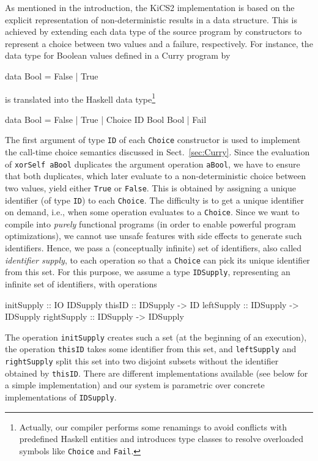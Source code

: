 \documentclass{llncs}
\newcommand{\code}[1]{\mbox{\small\texttt{#1}}}
\begin{document}
As mentioned in the introduction, the KiCS2 implementation
is based on the explicit representation of non-deterministic results
in a data structure.
This is achieved by extending each data type of the source program
by constructors to represent a choice between two values
and a failure, respectively.
For instance, the data type for Boolean values defined in a Curry program by
\begin{curry}
  data Bool = False | True
\end{curry}
is translated into the Haskell data type\footnote{Actually,
our compiler performs some renamings to avoid conflicts with
predefined Haskell entities and introduces type classes
to resolve overloaded symbols like \code{Choice} and \code{Fail}.}
\begin{haskell}
  data Bool = False | True | Choice ID Bool Bool | Fail
\end{haskell}
The first argument of type \code{ID} of each \code{Choice} constructor
is used to implement the call-time choice semantics
discussed in Sect.~\ref{sec:Curry}.
Since the evaluation of \code{xorSelf aBool} duplicates
the argument operation \code{aBool}, we have to ensure
that both duplicates, which later evaluate to a non-deterministic
choice between two values, yield either \code{True} or \code{False}.
This is obtained by assigning a unique identifier (of type \code{ID})
to each \code{Choice}. The difficulty is to get a unique identifier
on demand, i.e., when some operation evaluates to a \code{Choice}.
Since we want to compile into \emph{purely} functional programs
(in order to enable powerful program optimizations),
we cannot use unsafe features with side effects to generate
such identifiers.
Hence, we pass a (conceptually infinite) set of identifiers,
also called \emph{identifier supply},
to each operation so that a \code{Choice} can pick its unique identifier from
this set.
For this purpose, we assume a type \code{IDSupply},
representing an infinite set of identifiers,
with operations
\begin{haskell}
  initSupply  :: IO IDSupply
  thisID      :: IDSupply -> ID
  leftSupply  :: IDSupply -> IDSupply
  rightSupply :: IDSupply -> IDSupply
\end{haskell}
The operation \code{initSupply} creates such a set (at the beginning
of an execution),
the operation \code{thisID} takes some identifier from this set, and
\code{leftSupply} and \code{rightSupply} split this set
into two disjoint subsets without the identifier
obtained by \code{thisID}.
There are different implementations available \cite{AugustssonRittriSynek94}
(see below for a simple implementation) and our system
is parametric over concrete implementations of \code{IDSupply}.
\end{document}
